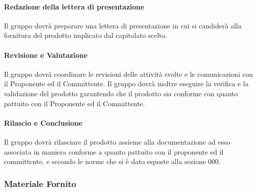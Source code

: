 			\paragraph{Redazione della lettera di presentazione}
				Il gruppo dovrà preparare una lettera di presentazione in cui si candiderà alla fornitura del prodotto implicato dal capitolato scelto.\\
			\paragraph{Revisione e Valutazione}
				Il gruppo dovrà coordinare le revisioni delle attività svolte e le comunicazioni con il Proponente ed il Committente. Il gruppo dovrà inoltre eseguire la verifica e la validazione del prodotto garantendo che il prodotto sia conforme con quanto pattuito con il Proponente ed il Committente.\\
			\paragraph{Rilascio e Conclusione}
				Il gruppo dovrà rilasciare il prodotto assieme alla documentazione ad esso associata in maniera conforme a quanto pattuito con il proponente ed il committente, e secondo le norme che si è dato esposte alla sezione 000.\\
		
		\subsubsection{Materiale Fornito}
